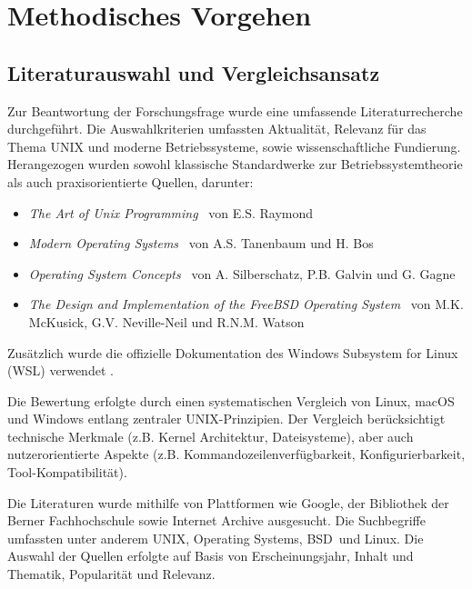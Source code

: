 \section{Methodisches Vorgehen}

\subsection{Literaturauswahl und Vergleichsansatz}

Zur Beantwortung der Forschungsfrage wurde eine umfassende Literaturrecherche durchgeführt. Die Auswahlkriterien umfassten Aktualität, Relevanz für das
Thema \glqq UNIX und moderne Betriebssysteme\grqq, sowie wissenschaftliche Fundierung. Herangezogen wurden sowohl klassische Standardwerke zur Betriebssystemtheorie
als auch praxisorientierte Quellen, darunter:

\begin{itemize}
	\setlength{\itemsep}{0pt}
	\item \textit{\glqq The Art of Unix Programming\grqq} \ von E.S. Raymond \cite{ArtOfUnixProgramming}
	\item \textit{\glqq Modern Operating Systems\grqq} \ von A.S. Tanenbaum und H. Bos \cite{ModernOS}
	\item \textit{\glqq Operating System Concepts\grqq} \ von A. Silberschatz, P.B. Galvin und G. Gagne \cite{OSConcept}
	\item \textit{\glqq The Design and Implementation of the FreeBSD Operating System\grqq} \ von M.K. McKusick, G.V. Neville-Neil und R.N.M. Watson \cite{FreeBSDOS}
\end{itemize}

Zusätzlich wurde die offizielle Dokumentation des Windows Subsystem for Linux (WSL) verwendet \cite{WSL}.

Die Bewertung erfolgte durch einen systematischen Vergleich von Linux, macOS und Windows entlang zentraler UNIX-Prinzipien. Der Vergleich berücksichtigt
technische Merkmale (z.B. Kernel Architektur, Dateisysteme), aber auch nutzerorientierte Aspekte (z.B. Kommandozeilenverfügbarkeit, Konfigurierbarkeit,
Tool-Kompatibilität).

Die Literaturen wurde mithilfe von Plattformen wie Google, der Bibliothek der Berner Fachhochschule sowie Internet Archive ausgesucht. Die Suchbegriffe umfassten
unter anderem \glqq UNIX\grqq, \glqq Operating Systems\grqq, \glqq BSD\grqq \ und \glqq Linux\grqq. Die Auswahl der Quellen erfolgte auf Basis von Erscheinungsjahr,
Inhalt und Thematik, Popularität und Relevanz.

